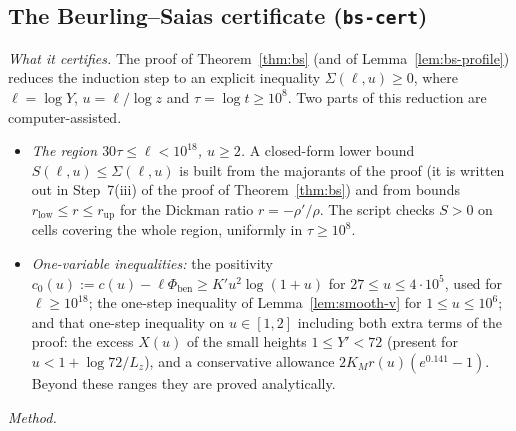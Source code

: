 \subsection{The Beurling--Saias certificate (\texttt{bs-cert})}\label{app:cert-bs}
\emph{What it certifies.} The proof of Theorem~\ref{thm:bs} (and of Lemma~\ref{lem:bs-profile}) reduces the induction step to an
explicit inequality $\Sigma(\ell,u)\ge0$, where $\ell=\log Y$, $u=\ell/\log z$ and $\tau=\log t\ge10^8$. Two parts of this reduction
are computer-assisted.
\begin{itemize}
\item \emph{The region $30\tau\le\ell<10^{18}$, $u\ge2$.} A closed-form lower bound $S(\ell,u)\le\Sigma(\ell,u)$ is built from the
majorants of the proof (it is written out in Step~7(iii) of the proof of Theorem~\ref{thm:bs}) and from bounds $r_{\mathrm{low}}\le r\le r_{\mathrm{up}}$ for the Dickman ratio $r=-\rho'/\rho$. The script
checks $S>0$ on cells covering the whole region, uniformly in $\tau\ge10^8$.
\item \emph{One-variable inequalities:} the positivity $c_0(u):=c(u)-\ell\Phi_{\mathrm{ben}}\ge K'u^2\log(1+u)$ for
$27\le u\le4\cdot10^5$, used for $\ell\ge10^{18}$; the one-step inequality of Lemma~\ref{lem:smooth-v} for $1\le u\le10^6$; and that one-step inequality on
$u\in[1,2]$ including both extra terms of the proof: the excess $X(u)$ of the small heights $1\le Y'<72$ (present for
$u<1+\log72/L_z$), and a conservative allowance $2K_Mr(u)(e^{0.141}-1)$. Beyond these ranges they are proved analytically.
\end{itemize}
\emph{Method.}
